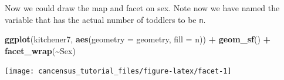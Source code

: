 \documentclass[
]{article}
\newenvironment{Shaded}{\begin{snugshade}}{\end{snugshade}}
\newcommand{\DataTypeTok}[1]{\textcolor[rgb]{0.13,0.29,0.53}{#1}}
\newcommand{\KeywordTok}[1]{\textcolor[rgb]{0.13,0.29,0.53}{\textbf{#1}}}
\newcommand{\NormalTok}[1]{#1}
\newcommand{\OperatorTok}[1]{\textcolor[rgb]{0.81,0.36,0.00}{\textbf{#1}}}
\newcommand{\StringTok}[1]{\textcolor[rgb]{0.31,0.60,0.02}{#1}}
\begin{document}
Now we could draw the map and facet on sex. Note now we have named the
variable that has the actual number of toddlers to be \texttt{n}.

\begin{Shaded}
\begin{Highlighting}[]
\KeywordTok{ggplot}\NormalTok{(kitchener7, }\KeywordTok{aes}\NormalTok{(}\DataTypeTok{geometry =}\NormalTok{ geometry, }\DataTypeTok{fill =}\NormalTok{ n)) }\OperatorTok{+}\StringTok{ }\KeywordTok{geom\_sf}\NormalTok{() }\OperatorTok{+}\StringTok{ }\KeywordTok{facet\_wrap}\NormalTok{(}\OperatorTok{\textasciitilde{}}\NormalTok{Sex)}
\end{Highlighting}
\end{Shaded}

\begin{center}\texttt{[image: cancensus\_tutorial\_files/figure-latex/facet-1]} \end{center}
\end{document}

